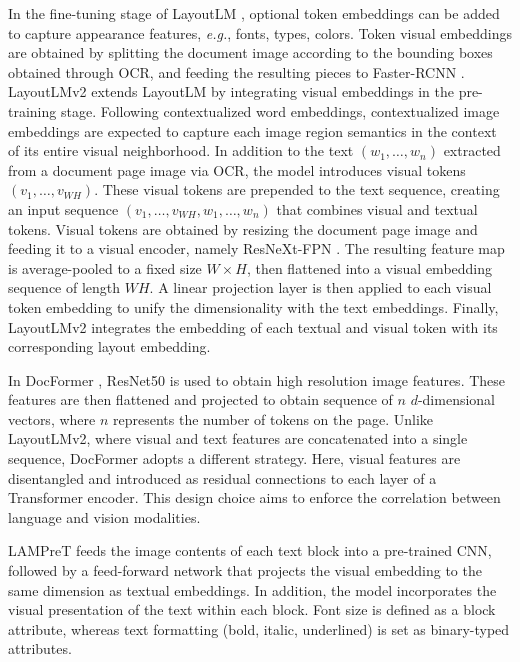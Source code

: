 In the fine-tuning stage of LayoutLM \citep{xu2020layoutlm}, optional token embeddings can be added to capture appearance features, \textit{e.g.}, fonts, types, colors. Token visual embeddings are obtained by splitting the document image according to the bounding boxes obtained through \ac{OCR}, and feeding the resulting pieces to Faster-RCNN \citep{ren2015faster}. LayoutLMv2 \citep{xu2020layoutlmv2} extends LayoutLM by integrating visual embeddings in the pre-training stage. Following contextualized word embeddings, contextualized image embeddings are expected to capture each image region semantics in the context of its entire visual neighborhood. In addition to the text $(w_1, \ldots, w_n)$ extracted from a document page image via \ac{OCR}, the model introduces visual tokens $(v_1, \ldots, v_{WH})$. These visual tokens are prepended to the text sequence, creating an input sequence $(v_1, \ldots, v_{WH}, w_1, \ldots, w_n)$ that combines visual and textual tokens. Visual tokens are obtained by resizing the document page image and feeding it to a visual encoder, namely ResNeXt-FPN \citep{xie2017aggregated, lin2017feature}. The resulting feature map is average-pooled to a fixed size $W \times H$, then flattened into a visual embedding sequence of length $WH$. A linear projection layer is then applied to each visual token embedding to unify the dimensionality with the text embeddings. Finally, LayoutLMv2 integrates the embedding of
each textual and visual token with its corresponding layout embedding. 

In DocFormer \citep{appalaraju2021docformer}, ResNet50 \citep{he2016deep} is used to obtain high resolution image features. These features are then flattened and projected to obtain sequence of $n$ $d$-dimensional vectors, where $n$ represents the number of tokens on the page. Unlike LayoutLMv2, where visual and text features are concatenated into a single sequence, DocFormer adopts a different strategy. Here, visual features are disentangled and introduced as residual connections to each layer of a Transformer encoder. This design choice aims to enforce the correlation between language and vision modalities. 

\ac{LAMPreT} \citep{wu2021lampret} feeds the image contents of each text block into a pre-trained \ac{CNN}, followed by a feed-forward network that projects the visual embedding to the same dimension as textual embeddings. In addition, the model incorporates the visual presentation of the text within each block. Font size is defined as a block attribute, whereas text formatting (bold, italic, underlined) is set as binary-typed attributes. 

